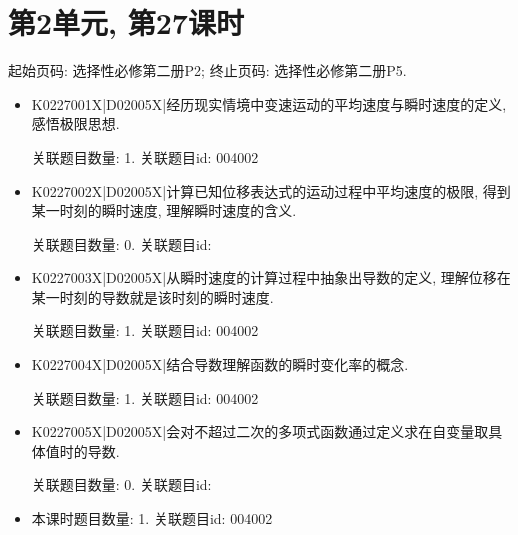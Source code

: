 \section*{第2单元, 第27课时}
起始页码: 选择性必修第二册P2; 终止页码: 选择性必修第二册P5.
\begin{itemize}
\item K0227001X|D02005X|经历现实情境中变速运动的平均速度与瞬时速度的定义, 感悟极限思想.

关联题目数量: 1. 关联题目id: 004002

\item K0227002X|D02005X|计算已知位移表达式的运动过程中平均速度的极限, 得到某一时刻的瞬时速度, 理解瞬时速度的含义.

关联题目数量: 0. 关联题目id: 

\item K0227003X|D02005X|从瞬时速度的计算过程中抽象出导数的定义, 理解位移在某一时刻的导数就是该时刻的瞬时速度.

关联题目数量: 1. 关联题目id: 004002

\item K0227004X|D02005X|结合导数理解函数的瞬时变化率的概念.

关联题目数量: 1. 关联题目id: 004002

\item K0227005X|D02005X|会对不超过二次的多项式函数通过定义求在自变量取具体值时的导数.

关联题目数量: 0. 关联题目id: 

\item 本课时题目数量: 1. 关联题目id: 004002

\end{itemize}


